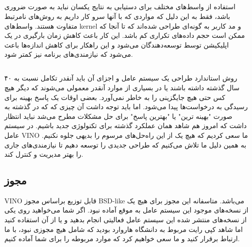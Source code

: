 \documentclass[20pt, a4paper]{article}
\begin{document}
\subsection{}

استفاده از واسط‌های مختلف برای دستیابی به نتایج یکسان نباید به صورت ضروری باشد،
فقط به این دلیل که مواردی که با آنها سرو کار داریم به روش‌های نامرتبط متفاوت
هستند. واسط‌های kernel و مد کاربر به گونه‌ای طراحی شده‌اند که تا آنجا که ممکن
است حجم داده‌های تکراری کم باشد. این کار باعث کاهش زمان بارگیری در یک اپلیکیشن
توسط توسعه‌دهندگان می‌شود و این راهکار برای کاهش اندازه‌ها باعث می‌شود که
نیازمندی‌های برنامه نیز کمتر شود.

\subsection{}

روش استاندارد طراحی یک سیستم عامل و اجزای ‌آن باید آنقدر تکامل نسبت به ۴۰ سال
گذشته داشته باشند یا در بسیاری از موارد آنقدر معمولی می‌شوند که دیگر هیچ کس حتی
هیچ جایگزینی را به خاطر نمی‌آورد. بعضی اوقات یک پاسخ بهینه برای رسیدگی به
درخواست‌ها پیدا می‌شود. اما باید توجه داشت آن چیزی که که در گذشته به صورت "بهینه
ترین" یا "بهترین پاسخ" برای حل مشکلات مطرح می‌شد نباید انتظار داشت که امروز هم
شاهد همان عملکرد گذشته برای تکنولوژی جدید باشیم. در سیستم عامل VINO ما سعی کردیم
که هیچ یک از این راه‌حل‌های مرسوم را بدیهی جلوه نکنیم. به همین دلیل ما تلاش
می‌کنیم که طراحی جدیدی را توسعه دهیم تا نیازمندی‌های جاری را بهتر مدیریت و کنترل
کند.

\subsection{مجوز}

VINO قابل توزیع براساس مجوز BSD-like می‌باشد. متاسفانه این مجوز برای هیچ یک از
نسخه‌های موجود این سیستم عامل به موقع آماده نبود. اگر شما می‌خواهید روی یکی از
نسخه‌های منتشر شده این سیستم عامل فعالیتی انجام بدهید و یا از آن استفاده کنید
اما شاهد کپی رایت مربوط به دانشگاه هاروارد بودید که شامل هیچ مجوزی نبود، با ما
ارتباط برقرار کنید و ما سعی خواهیم کرد که موارد مربوطه را برای شما آماده کنیم.
\end{document}
